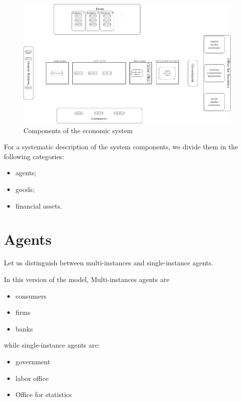 \documentclass{book}
\begin{document}
\begin{figure}[htp]
\hskip-1cm\includegraphics[scale=0.5]{agents_and_interactions_figure1-0.pdf}
	\caption{Components of the economic system}
	\label{fig:components}
\end{figure}
For a systematic description of the system components, we divide them in the following categories:
\begin{itemize}
	\item agents;
	\item goods;
	\item financial assets.
\end{itemize}
\section{Agents}

Let us distinguish between multi-instances and single-instance agents.  

In this version of the model, Multi-instances agents are
\begin{itemize}
	\item consumers
	\item firms
	\item banks
\end{itemize}
while single-instance agents are:
\begin{itemize}
	\item government
	\item labor office
	\item Office for statistics
\end{itemize}
\end{document}
